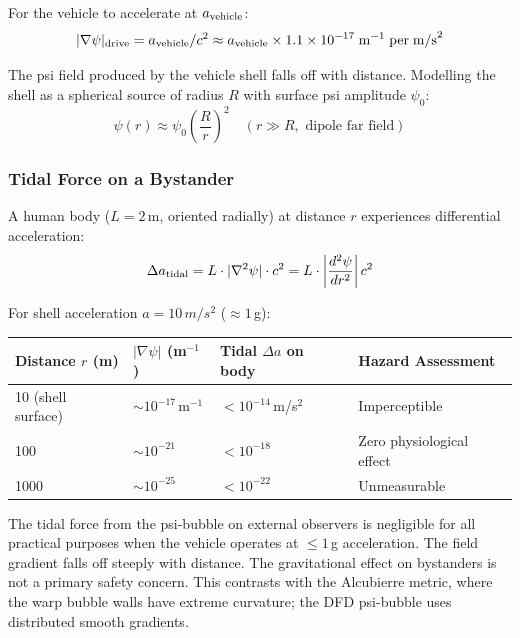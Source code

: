 \documentclass[11pt,a4paper]{article}
\begin{document}
For the vehicle to accelerate at $a_{\rm vehicle}$:
\begin{equation}
  |\nabla\psi|_{\rm drive} = a_{\rm vehicle} / c^2
  \approx a_{\rm vehicle} \times 1.1 \times 10^{-17} \; \text{m}^{-1}
  \; \text{per} \; \text{m/s}^2
\end{equation}

The psi field produced by the vehicle shell falls off with distance.
Modelling the shell as a spherical source of radius $R$ with surface
psi amplitude $\psi_0$:
\begin{equation}
  \psi(r) \approx \psi_0 \left(\frac{R}{r}\right)^2
  \quad (r \gg R, \text{ dipole far field})
\end{equation}

\subsubsection{Tidal Force on a Bystander}

A human body ($L = 2$\,m, oriented radially) at distance $r$ experiences
differential acceleration:
\begin{equation}
  \Delta a_{\rm tidal} = L \cdot |\nabla^2 \psi| \cdot c^2
  = L \cdot \left|\frac{d^2\psi}{dr^2}\right| c^2
\end{equation}

For shell acceleration $a = 10\,\si{m/s^2}$ ($\approx 1$\,g):

\begin{longtable}{p{0.15\tw}p{0.20\tw}p{0.20\tw}p{0.35\tw}}
\toprule
\textbf{Distance $r$ (m)} & \textbf{$|\nabla\psi|$ (m$^{-1}$)} &
\textbf{Tidal $\Delta a$ on body} & \textbf{Hazard Assessment} \\
\midrule
\endhead
10 (shell surface) & $\sim 10^{-17}$\,m$^{-1}$ & $< 10^{-14}$\,m/s$^2$
  & Imperceptible \\
100 & $\sim 10^{-21}$ & $< 10^{-18}$ & Zero physiological effect \\
1000 & $\sim 10^{-25}$ & $< 10^{-22}$ & Unmeasurable \\
\bottomrule
\end{longtable}

\begin{notebox}
The tidal force from the psi-bubble on external observers is negligible
for all practical purposes when the vehicle operates at $\leq 1$\,g
acceleration. The field gradient falls off steeply with distance.
The gravitational effect on bystanders is not a primary safety concern.
This contrasts with the Alcubierre metric, where the warp bubble walls
have extreme curvature; the DFD psi-bubble uses distributed smooth
gradients.
\end{notebox}
\end{document}
